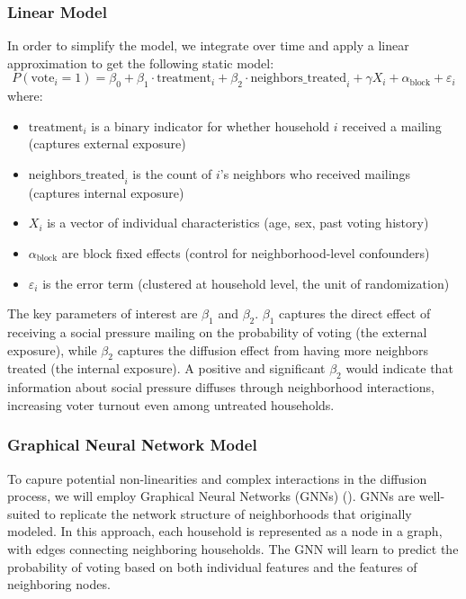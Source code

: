 \documentclass[11pt, draft]{article}
\begin{document}
\subsubsection{Linear Model}
In order to simplify the model, we integrate over time and apply a linear approximation to get the following static model:
\begin{equation*}
    P(\text{vote}_i = 1) = \beta_0 + \beta_1 \cdot \text{treatment}_i + \beta_2 \cdot \text{neighbors\_treated}_i + \gamma X_i + \alpha_{\text{block}} + \varepsilon_i
\end{equation*}
where:
\begin{itemize}[noitemsep]
    \item $\text{treatment}_i$ is a binary indicator for whether household $i$ received a mailing (captures external exposure)
    \item $\text{neighbors\_treated}_i$ is the count of $i$'s neighbors who received mailings (captures internal exposure)
    \item $X_i$ is a vector of individual characteristics (age, sex, past voting history)
    \item $\alpha_{\text{block}}$ are block fixed effects (control for neighborhood-level confounders)
    \item $\varepsilon_i$ is the error term (clustered at household level, the unit of randomization)
\end{itemize}


The key parameters of interest are $\beta_1$ and $\beta_2$. $\beta_1$ captures the direct effect of receiving a social pressure mailing on the probability of voting (the external exposure), while $\beta_2$ captures the diffusion effect from having more neighbors treated (the internal exposure). A positive and significant $\beta_2$ would indicate that information about social pressure diffuses through neighborhood interactions, increasing voter turnout even among untreated households.

\subsubsection{Graphical Neural Network Model}
To capure potential non-linearities and complex interactions in the diffusion process, we will employ Graphical Neural Networks (GNNs) (\cite{kipf_semi-supervised_2017}). GNNs are well-suited to replicate the network structure of neighborhoods that \cite{myers_information_2012} originally modeled. In this approach, each household is represented as a node in a graph, with edges connecting neighboring households. The GNN will learn to predict the probability of voting based on both individual features and the features of neighboring nodes.
\end{document}
